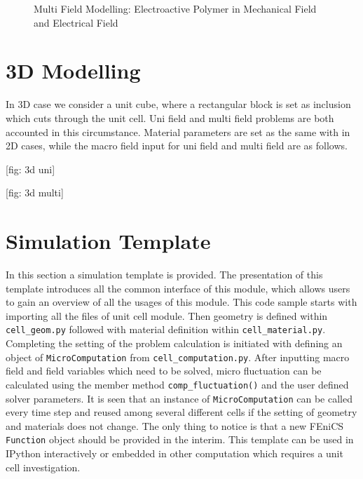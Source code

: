 \begin{figure}[htbp]
  \caption{Multi Field Modelling: Electroactive Polymer in Mechanical Field and Electrical Field}
\end{figure}

\newpage
\section{3D Modelling}
In 3D case we consider a unit cube, where a rectangular block is set as inclusion which cuts through the unit cell. Uni field and multi field problems are both accounted in this circumstance. Material parameters are set as the same with in 2D cases, while the macro field input for uni field and multi field are as follows.



[fig: 3d uni]

[fig: 3d multi]

\section{Simulation Template}
In this section a simulation template is provided. The presentation of this template introduces all the common interface of this module, which allows users to gain an overview of all the usages of this module. This code sample starts with importing all the files of unit cell module. Then geometry is defined within \texttt{cell\_geom.py} followed with material definition within \texttt{cell\_material.py}. Completing the setting of the problem calculation is initiated with defining an object of \texttt{MicroComputation} from \texttt{cell\_computation.py}. After inputting macro field and field variables which need to be solved, micro fluctuation can be calculated using the member method \texttt{comp\_fluctuation()} and the user defined solver parameters. It is seen that an instance of \texttt{MicroComputation} can be called every time step and reused among several different cells if the setting of geometry and materials does not change. The only thing to notice is that a new FEniCS \texttt{Function} object should be provided in the interim. This template can be used in IPython interactively or embedded in other computation which requires a unit cell investigation.

